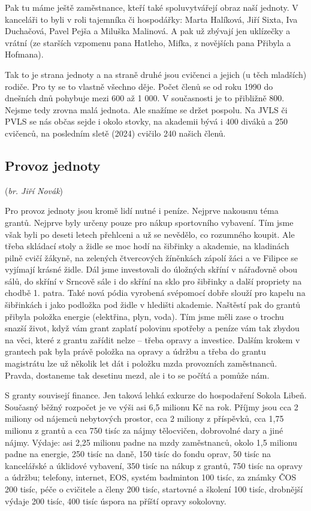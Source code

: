 Pak tu máme ještě zaměstnance, kteří také spoluvytvářejí obraz naší
jednoty. V kanceláři to byli v roli tajemníka či hospodářky: Marta
Halíková, Jiří Sixta, Iva Duchačová, Pavel Pejša a Miluška Malinová. A
pak už zbývají jen uklízečky a vrátní (ze starších vzpomenu pana
Hatleho, Mifka, z novějších pana Přibyla a Hofmana).

Tak to je strana jednoty a na straně druhé jsou cvičenci a jejich (u
těch mladších) rodiče. Pro ty se to vlastně všechno děje. Počet členů se
od roku 1990 do dnešních dnů pohybuje mezi 600 až 1 000. V současnosti
je to přibližně 800. Nejsme tedy zrovna malá jednota. Ale snažíme se
držet pospolu. Na JVLS či PVLS se nás občas sejde i okolo stovky, na
akademii bývá i 400 diváků a 250 cvičenců, na posledním sletě (2024)
cvičilo 240 našich členů.

\subsection{\texorpdfstring{Provoz jednoty
}{Provoz jednoty }}\label{provoz-jednoty}

(\emph{br. Jiří Novák})

Pro provoz jednoty jsou kromě lidí nutné i peníze. Nejprve nakousnu téma
grantů. Nejprve byly určeny pouze pro nákup sportovního vybavení. Tím
jsme však byli po deseti letech přehlceni a už se nevědělo, co rozumného
koupit. Ale třeba skládací stoly a židle se moc hodí na šibřinky a
akademie, na kladinách pilně cvičí žákyně, na zelených čtvercových
žíněnkách zápolí žáci a ve Filipce se vyjímají krásné židle. Dál jsme
investovali do úložných skříní v nářaďovně obou sálů, do skříní v
Srncově sále i do skříní na sklo pro šibřinky a další propriety na
chodbě 1. patra. Také nová pódia vyrobená svépomocí dobře slouží pro
kapelu na šibřinkách i jako podložka pod židle v hledišti akademie.
Naštěstí pak do grantů přibyla položka energie (elektřina, plyn, voda).
Tím jsme měli zase o trochu snazší život, když vám grant zaplatí
polovinu spotřeby a peníze vám tak zbydou na věci, které z grantu
zařídit nelze -- třeba opravy a investice. Dalším krokem v grantech pak
byla právě položka na opravy a údržbu a třeba do grantu magistrátu lze
už několik let dát i položku mzda provozních zaměstnanců. Pravda,
dostaneme tak desetinu mezd, ale i to se počítá a pomůže nám.

S granty souvisejí finance. Jen taková lehká exkurze do hospodaření
Sokola Libeň. Současný běžný rozpočet je ve výši asi 6,5 milionu Kč na
rok. Příjmy jsou cca 2 miliony od nájemců nebytových prostor, cca 2
miliony z příspěvků, cca 1,75 milionu z grantů a cca 750 tisíc za nájmy
tělocvičen, dobrovolné dary a jiné nájmy. Výdaje: asi 2,25 milionu padne
na mzdy zaměstnanců, okolo 1,5 milionu padne na energie, 250 tisíc na
daně, 150 tisíc do fondu oprav, 50 tisíc na kancelářské a úklidové
vybavení, 350 tisíc na nákup z grantů, 750 tisíc na opravy a údržbu;
telefony, internet, EOS, systém badminton 100 tisíc, za známky ČOS 200
tisíc, péče o cvičitele a členy 200 tisíc, startovné a školení 100
tisíc, drobnější výdaje 200 tisíc, 400 tisíc úspora na příští opravy
sokolovny.

